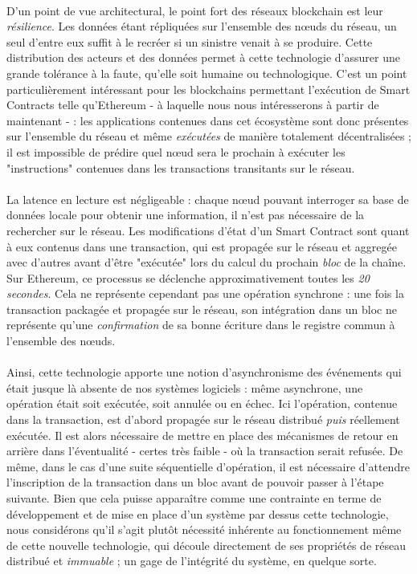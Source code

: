 \paragraph{} D'un point de vue architectural, le point fort des réseaux blockchain est leur \emph{résilience}. Les données
étant répliquées sur l'ensemble des n\oe{}uds du réseau, un seul d'entre eux suffit à le recréer si un sinistre venait à se
produire. Cette distribution des acteurs et des données permet à cette technologie d'assurer une grande tolérance à la faute,
qu'elle soit humaine ou technologique. C'est un point particulièrement intéressant pour les blockchains permettant l'exécution
de Smart Contracts telle qu'Ethereum - à laquelle nous nous intéresserons à partir de maintenant - : les applications contenues
dans cet écosystème sont donc présentes sur l'ensemble du réseau et même \emph{exécutées} de manière totalement décentralisées ;
il est impossible de prédire quel n\oe{}ud sera le prochain à exécuter les "instructions" contenues dans les transactions 
transitants sur le réseau.

\paragraph{} La latence en lecture est négligeable : chaque n\oe{}ud pouvant interroger sa base de données locale pour obtenir
une information, il n'est pas nécessaire de la rechercher sur le réseau. Les modifications d'état d'un Smart Contract sont
quant à eux contenus dans une transaction, qui est propagée sur le réseau et aggregée avec d'autres avant d'être "exécutée"
lors du calcul du prochain \emph{bloc} de la chaîne. Sur Ethereum, ce processus se déclenche approximativement toutes les
\emph{20 secondes}. Cela ne représente cependant pas une opération synchrone : une fois la transaction packagée et propagée
sur le réseau, son intégration dans un bloc ne représente qu'une \emph{confirmation} de sa bonne écriture dans le registre 
commun à l'ensemble des n\oe{}uds.

\paragraph{} Ainsi, cette technologie apporte une notion d'asynchronisme des événements qui était jusque là absente de nos
systèmes logiciels : même asynchrone, une opération était soit exécutée, soit annulée ou en échec. Ici l'opération, contenue 
dans la transaction, est d'abord propagée sur le réseau distribué \emph{puis} réellement exécutée. Il est alors nécessaire 
de mettre en place des mécanismes de retour en arrière dans l'éventualité - certes très faible - où la transaction serait refusée.
De même, dans le cas d'une suite séquentielle d'opération, il est nécessaire d'attendre l'inscription de la transaction dans 
un bloc avant de pouvoir passer à l'étape suivante. Bien que cela puisse apparaître comme une contrainte en terme de développement
et de mise en place d'un système par dessus cette technologie, nous considérons qu'il s'agit plutôt nécessité inhérente au 
fonctionnement même de cette nouvelle technologie, qui découle directement de ses propriétés de réseau distribué et \emph{immuable} ;
un gage de l'intégrité du système, en quelque sorte.

